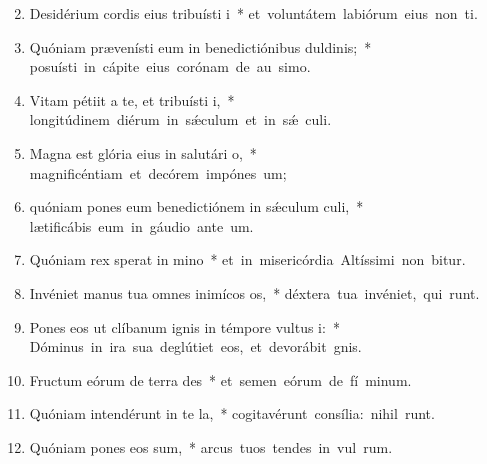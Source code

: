\begin{flushleft}
\begin{enumerate}[leftmargin=*]
\setcounter{enumi}{1}

\item Desidérium cordis eius tribuísti i~* \mbox{et voluntátem labiórum eius non ti.}

\item Quóniam prævenísti eum in benedictiónibus duldinis;~* \mbox{posuísti in cápite eius corónam de au simo.}

\item Vitam pétiit a te, et tribuísti i,~* \mbox{longitúdinem diérum in s\'{\ae}culum et in s\'{\ae} culi.}

\item Magna est glória eius in salutári o,~* \mbox{magnificéntiam et decórem impónes  um;}

\item quóniam pones eum benedictiónem in s\'{\ae}culum culi,~* \mbox{lætificábis eum in gáudio ante  um.}

\item Quóniam rex sperat in mino~* \mbox{et in misericórdia Altíssimi non bitur.}

\item Invéniet manus tua omnes inimícos os,~* \mbox{déxtera tua invéniet, qui  runt.}

\item Pones eos ut clíbanum ignis in témpore vultus i:~* \mbox{Dóminus in ira sua deglútiet eos, et devorábit  gnis.}

\item Fructum eórum de terra des~* \mbox{et semen eórum de fí minum.}

\item Quóniam intendérunt in te la,~* \mbox{cogitavérunt consília: nihil runt.}

\item Quóniam pones eos sum,~* \mbox{arcus tuos tendes in vul rum.}


\end{enumerate}
\end{flushleft}
